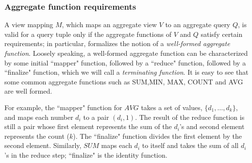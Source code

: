 
\subsubsection{Aggregate function requirements} \label{Sec: aggregate functions}
A view mapping $M$, which maps an aggregate view $V$ to an aggregate query $Q$, is valid for a query tuple only if the aggregate functions of $V$ and $Q$ satisfy certain requirements; in particular, \cite{cohen2006user}  formalizes the notion of a \textit{well-formed aggregate function}. Loosely speaking, a well-formed aggregate function can be characterized by some initial ``mapper" function, followed by a ``reduce" function, followed by a ``finalize" function, which we will call a \textit{terminating function}.
It is easy to see that some common aggregate functions such as SUM,MIN, MAX, COUNT and AVG are well formed.

For example, 
the ``mapper" function for $AVG$ takes a set of values, $\{d_1,\dots, d_k\}$, and maps each number $d_i$ to a pair $(d_i, 1)$.  The result of the reduce function is still a pair whose first element represents the sum of the $d_i$'s and second element represents the count ($k$).  The ``finalize" function divides the first element by the second element. Similarly, $SUM$ maps each $d_i$ to itself and takes the sum of all $d_i$'s in the reduce step; ``finalize" is the identity function.



